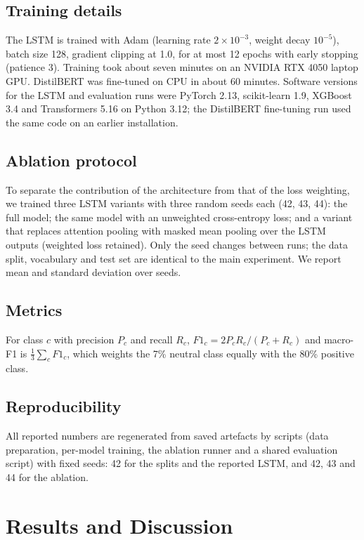 \documentclass[conference]{IEEEtran}
\begin{document}
\subsection{Training details}
The LSTM is trained with Adam \cite{kingma2015adam} (learning rate $2\times10^{-3}$, weight decay $10^{-5}$), batch size 128, gradient clipping at 1.0, for at most 12 epochs with early stopping (patience 3). Training took about seven minutes on an NVIDIA RTX 4050 laptop GPU. DistilBERT was fine-tuned on CPU in about 60 minutes. Software versions for the LSTM and evaluation runs were PyTorch 2.13, scikit-learn 1.9, XGBoost 3.4 and Transformers 5.16 on Python 3.12; the DistilBERT fine-tuning run used the same code on an earlier installation.

\subsection{Ablation protocol}
To separate the contribution of the architecture from that of the loss weighting, we trained three LSTM variants with three random seeds each (42, 43, 44): the full model; the same model with an unweighted cross-entropy loss; and a variant that replaces attention pooling with masked mean pooling over the LSTM outputs (weighted loss retained). Only the seed changes between runs; the data split, vocabulary and test set are identical to the main experiment. We report mean and standard deviation over seeds.

\subsection{Metrics}
For class $c$ with precision $P_c$ and recall $R_c$, $F1_c=2P_cR_c/(P_c+R_c)$ and macro-F1 is $\frac{1}{3}\sum_c F1_c$, which weights the 7\% neutral class equally with the 80\% positive class.

\subsection{Reproducibility}
All reported numbers are regenerated from saved artefacts by scripts (data preparation, per-model training, the ablation runner and a shared evaluation script) with fixed seeds: 42 for the splits and the reported LSTM, and 42, 43 and 44 for the ablation.

\section{Results and Discussion}
\end{document}
